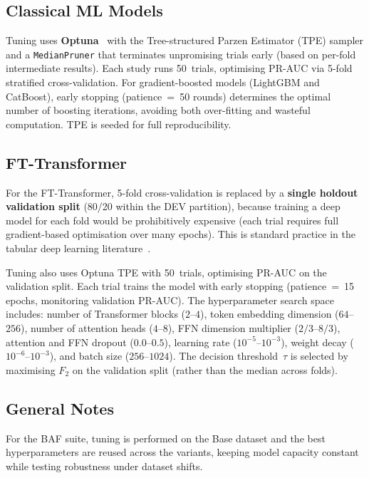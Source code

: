 \subsection{Classical ML Models}

Tuning uses \textbf{Optuna}~\cite{akiba2019optuna} with the Tree-structured Parzen Estimator (TPE) sampler and a \texttt{MedianPruner} that terminates unpromising trials early (based on per-fold intermediate results). Each study runs 50~trials, optimising PR-AUC via 5-fold stratified cross-validation. For gradient-boosted models (LightGBM and CatBoost), early stopping (patience~=~50 rounds) determines the optimal number of boosting iterations, avoiding both over-fitting and wasteful computation. TPE is seeded for full reproducibility.

\subsection{FT-Transformer}

For the FT-Transformer, 5-fold cross-validation is replaced by a \textbf{single holdout validation split} (80/20 within the DEV partition), because training a deep model for each fold would be prohibitively expensive (each trial requires full gradient-based optimisation over many epochs).
This is standard practice in the tabular deep learning literature~\cite{gorishniy2021revisiting}.

Tuning also uses Optuna TPE with 50~trials, optimising PR-AUC on the validation split.
Each trial trains the model with early stopping (patience~=~15 epochs, monitoring validation PR-AUC).
The hyperparameter search space includes: number of Transformer blocks ($2$--$4$), token embedding dimension ($64$--$256$), number of attention heads ($4$--$8$), FFN dimension multiplier ($2/3$--$8/3$), attention and FFN dropout ($0.0$--$0.5$), learning rate ($10^{-5}$--$10^{-3}$), weight decay ($10^{-6}$--$10^{-3}$), and batch size ($256$--$1024$).
The decision threshold~$\tau$ is selected by maximising $F_2$ on the validation split (rather than the median across folds).

\subsection{General Notes}

For the BAF suite, tuning is performed on the Base dataset and the best hyperparameters are reused across the variants, keeping model capacity constant while testing robustness under dataset shifts.

